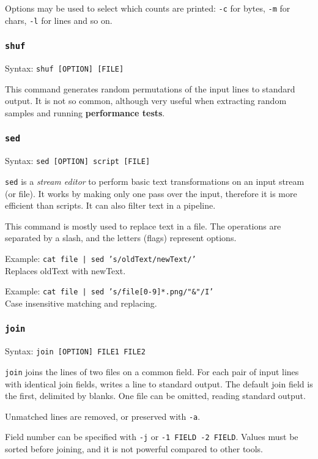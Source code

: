 Options may be used to select which counts are printed: \texttt{-c} for bytes, \texttt{-m} for chars, \texttt{-l} for lines and so on.

\subsubsection{\texttt{shuf}}
Syntax: \texttt{shuf [OPTION] [FILE]}

This command generates random permutations of the input lines to standard output. It is not so common, although very useful when extracting random samples and running \textbf{performance tests}.

\subsubsection{\texttt{sed}}
Syntax: \texttt{sed [OPTION] {script} [FILE]}

\texttt{sed} is a \textit{stream editor} to perform basic text transformations on an input stream (or file). It works by making only one pass over the input, therefore it is more efficient than scripts. It can also filter text in a pipeline.

This command is mostly used to replace text in a file. The operations are separated by a slash, and the letters (flags) represent options.

Example: \texttt{cat file | sed 's/oldText/newText/'} \\
Replaces oldText with newText.

Example: \texttt{cat file | sed 's/file[0-9]*.png/"\&"/I'} \\
Case insensitive matching and replacing.

\subsubsection{\texttt{join}}
Syntax: \texttt{join [OPTION] FILE1 FILE2}

\texttt{join} joins the lines of two files on a common field. For each pair of input lines with identical join fields, writes a line to standard output. The default join field is the first, delimited by blanks. One file can be omitted, reading standard output.

Unmatched lines are removed, or preserved with \texttt{-a}.

Field number can be specified with \texttt{-j} or \texttt{-1 FIELD -2 FIELD}. Values must be sorted before joining, and it is not powerful compared to other tools.

